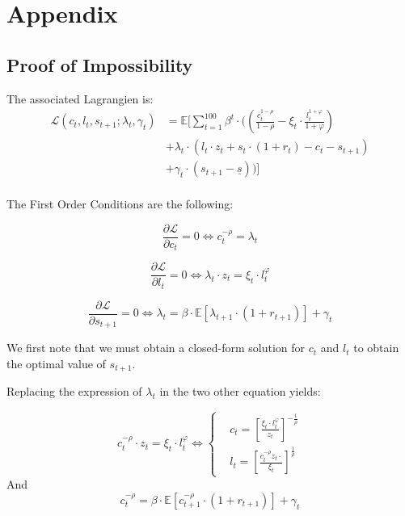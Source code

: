 \documentclass{article}
\begin{document}
\section{Appendix}


\subsection{Proof of Impossibility}

The associated Lagrangien is: 
\begin{equation}
    \begin{split}
        \mathcal{L}(c_{t},l_{t},s_{t+1};\lambda_t,\gamma_{t}) &
        = \mathbb{E}\Big[\sum_{t=1}^{100} \beta^{t}\cdot ((\frac{c_{t}^{1-\rho}}{1-\rho}-\xi_{t}\cdot\frac{l_{t}^{1+\varphi}}{1+\varphi}) \\
        & +\lambda_{t}\cdot \left(l_{t}\cdot z_{t}+s_{t}\cdot (1+r_{t})-c_{t}-s_{t+1}\right) \\ 
        & + \gamma_{t}\cdot \left(s_{t+1}-\underline{s}\right))\Big] \\ 
    \end{split}
\end{equation}

The First Order Conditions are the following:


$$\frac{\partial \mathcal{L}}{\partial c_{t}} = 0 \iff c_{t}^{-\rho} = \lambda_{t}$$


$$\frac{\partial \mathcal{L}}{\partial l_{t}} = 0 \iff \lambda_{t}\cdot z_{t} = \xi_{t}\cdot l_{t}^{\varphi}$$


$$\frac{\partial \mathcal{L}}{\partial s_{t+1}} = 0 \iff \lambda_{t} = \beta \cdot \mathbb{E}\left[\lambda_{t+1}\cdot (1+r_{t+1})\right] + \gamma_{t}$$

We first note that we must obtain a closed-form solution for $c_{t}$ and $l_{t}$ to obtain 
the optimal value of $s_{t+1}$. 

Replacing the expression of $\lambda_{t}$ in the two other equation yields: 

\begin{equation}
    c^{-\rho}_{t}\cdot z_{t} = \xi_{t}\cdot l_{t}^{\varphi} \iff
        \begin{cases}
        & c_t = \left[\frac{\xi_{t}\cdot l_{t}^{\varphi}}{z_{t}}\right]^{-\frac{1}{\rho}}\\ 
        & l_{t} = \left[\frac{c_{t}^{-\rho}z_{t}\cdot}{\xi_{t}}\right]^{\frac{1}{\rho}}
    \end{cases}
\end{equation}
And 
\begin{equation}
    c^{-\rho}_{t} = \beta \cdot \mathbb{E}\left[c^{-\rho}_{t+1}\cdot (1+r_{t+1})\right] + \gamma_{t}
\end{equation}
\end{document}
